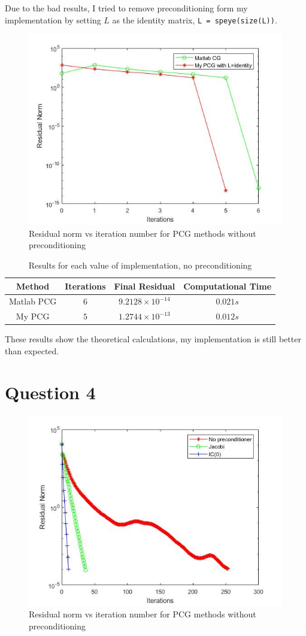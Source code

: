 \documentclass[a4paper, 11pt]{article}
\begin{document}
			
			Due to the bad results, I tried to remove preconditioning form my implementation by setting $L$ as the identity matrix, \texttt{L = speye(size(L))}.
			\begin{figure}[H]
					\centering
					\includegraphics[width=.6\linewidth]{ex3_NoPrec.jpg}
					\caption{Residual norm vs iteration number for PCG methods without preconditioning}
					\label{fig:ex3_NoPrec}
			\end{figure}
		
			\begin{table}[H]
				\centering
				\begin{tabular}{c|c|c|c}
					\textbf{Method} &  \textbf{Iterations} 	& \textbf{Final Residual} 		& \textbf{Computational Time} 	\\ \hline
					Matlab PCG		& 			$6$ 		& $ 9.2128 \times 10^{-14} $ 	& $ 0.021 s $	\\ \hline	
					My PCG 			& 			$5$			& $ 1.2744 \times 10^{-13} $	& $	0.012 s $	\\ \hline
				\end{tabular}
				\caption{Results for each value of implementation, no preconditioning}
				\label{table:ex3_NoPrec}
			\end{table}
			These results show the theoretical calculations, my implementation is still better than expected.
			
		
		
		
		\section*{Question 4}		
			\begin{figure}[H]
				\centering
				\includegraphics[width=.6\linewidth]{ex4.jpg}
				\caption{Residual norm vs iteration number for PCG methods without preconditioning}
				\label{fig:ex4}
			\end{figure}
		
\end{document}
